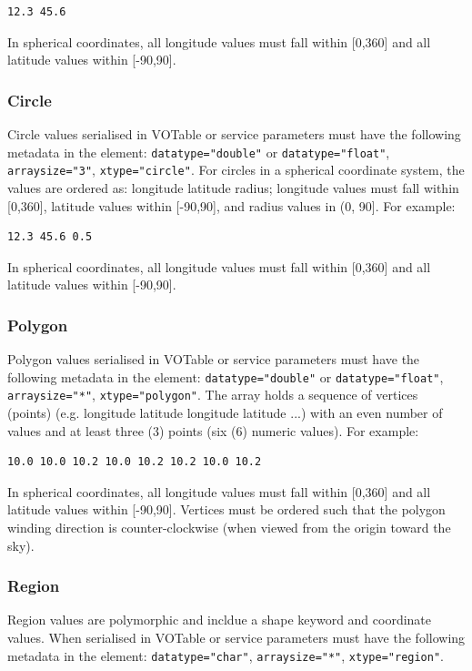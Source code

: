 \documentclass[11pt,letter]{ivoa}
\begin{document}
\begin{verbatim}
12.3 45.6
\end{verbatim}

In spherical coordinates, all longitude values must fall within [0,360] and all 
latitude values within [-90,90].

\subsubsection{Circle}
Circle values serialised in VOTable or service parameters must have the following metadata in the 
 element: \verb|datatype="double"| or \verb|datatype="float"|, \verb|arraysize="3"|,
\verb|xtype="circle"|. For circles 
in a spherical coordinate system, the values are ordered as: longitude latitude 
radius; longitude values must fall within [0,360], latitude values within [-90,90], and radius values in (0, 90]. For example:

\begin{verbatim}
12.3 45.6 0.5
\end{verbatim}

In spherical coordinates, all longitude values must fall within [0,360] and all 
latitude values within [-90,90].

\subsubsection{Polygon}
Polygon values serialised in VOTable or service parameters must have the following metadata in the 
 element: \verb|datatype="double"| or \verb|datatype="float"|, \verb|arraysize="*"|,
\verb|xtype="polygon"|. The 
array holds a sequence of vertices (points) (e.g. longitude latitude longitude 
latitude ...) with an even number of values and at least three (3) points (six 
(6) numeric values). For example:

\begin{verbatim}
10.0 10.0 10.2 10.0 10.2 10.2 10.0 10.2
\end{verbatim}

In spherical coordinates, all longitude values must fall within [0,360] and all 
latitude values within [-90,90]. Vertices must be ordered such that the polygon 
winding direction is counter-clockwise (when viewed from the origin toward the 
sky).

\subsubsection{Region}
Region values are polymorphic and incldue a shape keyword and coordinate 
values. When serialised in VOTable or service parameters must have the 
following metadata in the  element: \verb|datatype="char"|, 
\verb|arraysize="*"|, \verb|xtype="region"|. 
\end{document}
